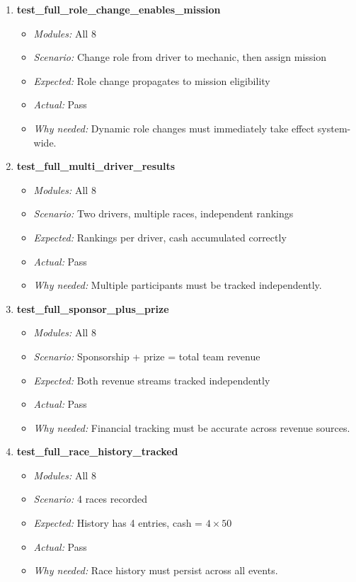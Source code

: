 \documentclass{article}
\begin{document}
\begin{enumerate}[resume, label=\textbf{TC\arabic*.}]
\item \textbf{test\_full\_role\_change\_enables\_mission}
\begin{itemize}[noitemsep]
  \item \textit{Modules:} All 8
  \item \textit{Scenario:} Change role from driver to mechanic, then assign mission
  \item \textit{Expected:} Role change propagates to mission eligibility
  \item \textit{Actual:} Pass
  \item \textit{Why needed:} Dynamic role changes must immediately take effect system-wide.
\end{itemize}

\item \textbf{test\_full\_multi\_driver\_results}
\begin{itemize}[noitemsep]
  \item \textit{Modules:} All 8
  \item \textit{Scenario:} Two drivers, multiple races, independent rankings
  \item \textit{Expected:} Rankings per driver, cash accumulated correctly
  \item \textit{Actual:} Pass
  \item \textit{Why needed:} Multiple participants must be tracked independently.
\end{itemize}

\item \textbf{test\_full\_sponsor\_plus\_prize}
\begin{itemize}[noitemsep]
  \item \textit{Modules:} All 8
  \item \textit{Scenario:} Sponsorship + prize = total team revenue
  \item \textit{Expected:} Both revenue streams tracked independently
  \item \textit{Actual:} Pass
  \item \textit{Why needed:} Financial tracking must be accurate across revenue sources.
\end{itemize}

\item \textbf{test\_full\_race\_history\_tracked}
\begin{itemize}[noitemsep]
  \item \textit{Modules:} All 8
  \item \textit{Scenario:} 4 races recorded
  \item \textit{Expected:} History has 4 entries, cash = $4 \times 50$
  \item \textit{Actual:} Pass
  \item \textit{Why needed:} Race history must persist across all events.
\end{itemize}


\end{enumerate}
\end{document}
